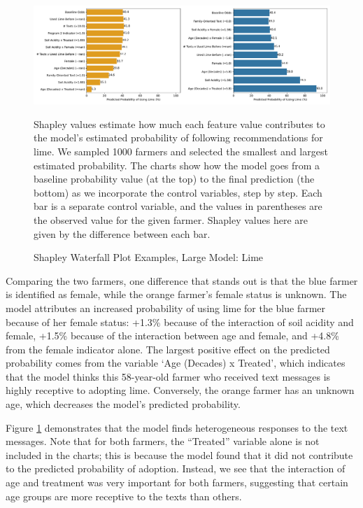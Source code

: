 \documentclass[12pt]{article}
\begin{document}
\begin{figure}[H]
    \centering
    \caption{Shapley Waterfall Plot Examples, Large Model: Lime}
    \includegraphics[width=\textwidth]{../output/shap_forceplot_examples_lime.pdf}
    \begin{minipage}{0.8\textwidth}
    \tiny
    Shapley values estimate how much each feature value contributes to the model's estimated probability of following recommendations for lime. We sampled 1000 farmers and selected the smallest and largest estimated probability. The charts show how the model goes from a baseline probability value (at the top) to the final prediction (the bottom) as we incorporate the control variables, step by step. Each bar is a separate control variable, and the values in parentheses are the observed value for the given farmer. Shapley values here are given by the difference between each bar.
    \end{minipage}
    \label{fig:shap_force}
\end{figure}

Comparing the two farmers, one difference that stands out is that the blue farmer is identified as female, while the orange farmer's female status is unknown. The model attributes an increased probability of using lime for the blue farmer because of her female status: +1.3\% because of the interaction of soil acidity and female, +1.5\% because of the interaction between age and female, and +4.8\% from the female indicator alone. The largest positive effect on the predicted probability comes from the variable `Age (Decades) x Treated', which indicates that the model thinks this 58-year-old farmer who received text messages is highly receptive to adopting lime. Conversely, the orange farmer has an unknown age, which decreases the model's predicted probability.

Figure \ref{fig:shap_force} demonstrates that the model finds heterogeneous responses to the text messages. Note that for both farmers, the ``Treated'' variable alone is not included in the charts; this is because the model found that it did not contribute to the predicted probability of adoption. Instead, we see that the interaction of age and treatment was very important for both farmers, suggesting that certain age groups are more receptive to the texts than others.
\end{document}
